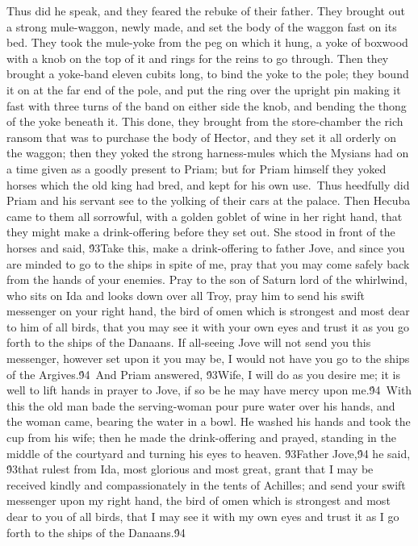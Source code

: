 {Thus did he speak, and they feared the rebuke of their father. They brought out a strong mule-waggon, newly made, and set the body of the waggon fast on its bed. They took the mule-yoke from the peg on which it hung, a yoke of boxwood with a knob on the top of it and rings for the reins to go through. Then they brought a yoke-band eleven cubits long, to bind the yoke to the pole; they bound it on at the far end of the pole, and put the ring over the upright pin making it fast with three turns of the band on either side the knob, and bending the thong of the yoke beneath it. This done, they brought from the store-chamber the rich ransom that was to purchase the body of Hector, and they set it all orderly on the waggon; then they yoked the strong harness-mules which the Mysians had on a time given as a goodly present to Priam; but for Priam himself they yoked horses which the old king had bred, and kept for his own use.\
Thus heedfully did Priam and his servant see to the yolking of their cars at the palace. Then Hecuba came to them all sorrowful, with a golden goblet of wine in her right hand, that they might make a drink-offering before they set out. She stood in front of the horses and said, \'93Take this, make a drink-offering to father Jove, and since you are minded to go to the ships in spite of me, pray that you may come safely back from the hands of your enemies. Pray to the son of Saturn lord of the whirlwind, who sits on Ida and looks down over all Troy, pray him to send his swift messenger on your right hand, the bird of omen which is strongest and most dear to him of all birds, that you may see it with your own eyes and trust it as you go forth to the ships of the Danaans. If all-seeing Jove will not send you this messenger, however set upon it you may be, I would not have you go to the ships of the Argives.\'94\
And Priam answered, \'93Wife, I will do as you desire me; it is well to lift hands in prayer to Jove, if so be he may have mercy upon me.\'94\
With this the old man bade the serving-woman pour pure water over his hands, and the woman came, bearing the water in a bowl. He washed his hands and took the cup from his wife; then he made the drink-offering and prayed, standing in the middle of the courtyard and turning his eyes to heaven. \'93Father Jove,\'94 he said, \'93that rulest from Ida, most glorious and most great, grant that I may be received kindly and compassionately in the tents of Achilles; and send your swift messenger upon my right hand, the bird of omen which is strongest and most dear to you of all birds, that I may see it with my own eyes and trust it as I go forth to the ships of the Danaans.\'94\
}
